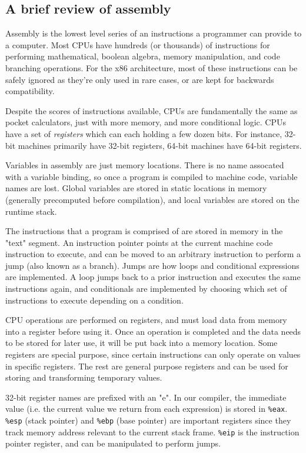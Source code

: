 \documentclass{book}
\newcommand{\Scribtexttt}[1]{{\texttt{#1}}}
\newcommand{\Ssubsubsection}[2]{\subsubsection[#1]{#2}}
\renewcommand{\Ssubsubsection}[2]{\subsection[#1]{#2}}
\begin{document}
\Ssubsubsection{A brief review of assembly}{A brief review of assembly}\label{t:x28part_x22Ax5fbriefx5freviewx5fofx5fassemblyx22x29}

Assembly is the lowest level series of an instructions a programmer can
provide to a computer. Most CPUs have hundreds (or thousands) of
instructions for performing mathematical, boolean algebra, memory
manipulation, and code branching operations. For the x86 architecture,
most of these instructions can be safely ignored as they{'}re only used in
rare cases, or are kept for backwards compatibility.

Despite the scores of instructions available, CPUs are fundamentally the
same as pocket calculators, just with more memory, and more conditional
logic. CPUs have a set of \textit{registers} which can each
holding a few dozen bits. For instance, 32{-}bit machines primarily have
32{-}bit registers, 64{-}bit machines have 64{-}bit registers.

Variables in assembly are just memory locations. There is no name
assocated with a variable binding, so once a program is compiled to
machine code, variable names are lost. Global variables are stored in
static locations in memory (generally precomputed before compilation), and
local variables are stored on the runtime stack.

The instructions that a program is comprised of are stored in memory in
the "text" segment. An instruction pointer points at the current machine
code instruction to execute, and can be moved to an arbitrary instruction
to perform a jump (also known as a branch). Jumps are how loops and
conditional expressions are implemented. A loop jumps back to a prior
instruction and executes the same instructions again, and conditionals are
implemented by choosing which set of instructions to execute depending on
a condition.

CPU operations are performed on registers, and must load data from memory
into a register before using it. Once an operation is completed and the
data needs to be stored for later use, it will be put back into a memory
location. Some registers are special purpose, since certain instructions
can only operate on values in specific registers. The rest are general
purpose registers and can be used for storing and transforming temporary
values.

32{-}bit register names are prefixed with an "e". In our compiler, the
immediate value (i.e. the current value we return from each expression) is
stored in \Scribtexttt{\%eax}. \Scribtexttt{\%esp} (stack pointer) and \Scribtexttt{\%ebp} (base
pointer) are important registers since they track memory address relevant
to the current stack frame. \Scribtexttt{\%eip} is the instruction pointer register,
and can be manipulated to perform jumps.
\end{document}
